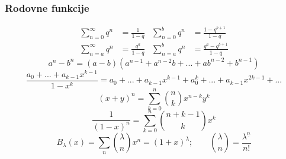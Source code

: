 	\subsubsection*{Rodovne funkcije}
	\[
		\begin{aligned}
			\sum_{n=0}^{\infty} q^n &= \frac{1}{1-q} &
			\sum_{n=0}^{b} q^n &= \frac{1-q^{b+1}}{1-q}
			\\
			\sum_{n=a}^{\infty} q^n &= \frac{q^{a}}{1-q} &
			\sum_{n=a}^{b} q^n &= \frac{q^a-q^{b+1}}{1-q}
		\end{aligned}
	\]
	\[
		a^n - b^n = (a-b)(a^{n-1} + a^{n-2}b + ... + ab^{n-2} + b^{n-1})  
	\]
	\[ \textstyle \frac{a_0 + ... + a_{k-1}x^{k-1}}{1-x^k} = a_0 + ... + a_{k-1}x^{k-1} + a_0^k + ... + a_{k-1}x^{2k-1} + ...\]
	\[ (x+y)^n = \sum_{k=0}^{n} \binom{n}{k} x^{n-k}y^{k} \]
	\[ \frac{1}{(1-x)^n} = \sum_{k=0}^{n} \binom{n+k-1}{k} x^{k} \]
	\[ B_\lambda(x) = \sum_{n} \binom{\lambda}{n} x^{n} = (1+x)^\lambda; \qquad \binom{\lambda}{n} = \frac{\lambda^{\underline{n}}}{n!}\]

